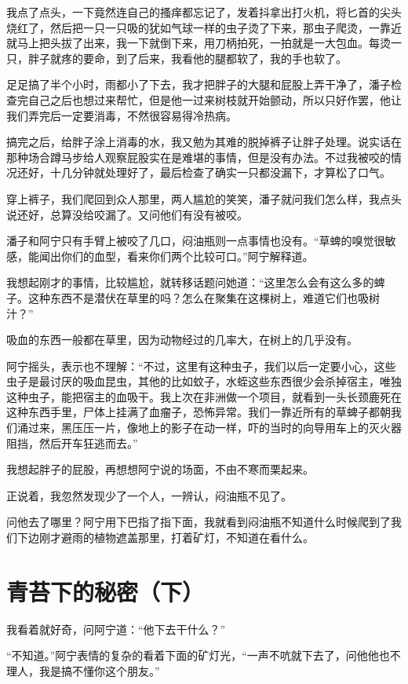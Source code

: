 我点了点头，一下竟然连自己的搔痒都忘记了，发着抖拿出打火机，将匕首的尖头烧红了，然后把一只一只吸的犹如气球一样的虫子烫了下来，那虫子爬烫，一靠近就马上把头拔了出来，我一下就倒下来，用刀柄拍死，一拍就是一大包血。每烫一只，胖子就疼的要命，到了后来，我看他的腿都软了，我的手也软了。

足足搞了半个小时，雨都小了下去，我才把胖子的大腿和屁股上弄干净了，潘子检查完自己之后也想过来帮忙，但是他一过来树枝就开始颤动，所以只好作罢，他让我们弄完后一定要消毒，不然很容易得冷热病。

搞完之后，给胖子涂上消毒的水，我又勉为其难的脱掉裤子让胖子处理。说实话在那种场合蹲马步给人观察屁股实在是难堪的事情，但是没有办法。不过我被咬的情况还好，十几分钟就处理好了，最后检查了确实一只都没漏下，才算松了口气。

穿上裤子，我们爬回到众人那里，两人尴尬的笑笑，潘子就问我们怎么样，我点头说还好，总算没给咬漏了。又问他们有没有被咬。

潘子和阿宁只有手臂上被咬了几口，闷油瓶则一点事情也没有。“草蜱的嗅觉很敏感，能闻出你们的血型，看来你们两个比较可口。”阿宁解释道。

我想起刚才的事情，比较尴尬，就转移话题问她道：“这里怎么会有这么多的蜱子。这种东西不是潜伏在草里的吗？怎么在聚集在这棵树上，难道它们也吸树汁？”

吸血的东西一般都在草里，因为动物经过的几率大，在树上的几乎没有。

阿宁摇头，表示也不理解：“不过，这里有这种虫子，我们以后一定要小心，这些虫子是最讨厌的吸血昆虫，其他的比如蚊子，水蛭这些东西很少会杀掉宿主，唯独这种虫子，能把宿主的血吸干。我上次在非洲做一个项目，就看到一头长颈鹿死在这种东西手里，尸体上挂满了血瘤子，恐怖异常。我们一靠近所有的草蜱子都朝我们涌过来，黑压压一片，像地上的影子在动一样，吓的当时的向导用车上的灭火器阻挡，然后开车狂逃而去。”

我想起胖子的屁股，再想想阿宁说的场面，不由不寒而栗起来。

正说着，我忽然发现少了一个人，一辨认，闷油瓶不见了。

问他去了哪里？阿宁用下巴指了指下面，我就看到闷油瓶不知道什么时候爬到了我们下边刚才避雨的植物遮盖那里，打着矿灯，不知道在看什么。

\chapter{青苔下的秘密（下）}

我看着就好奇，问阿宁道：“他下去干什么？”

“不知道。”阿宁表情的复杂的看着下面的矿灯光，“一声不吭就下去了，问他他也不理人，我是搞不懂你这个朋友。”

